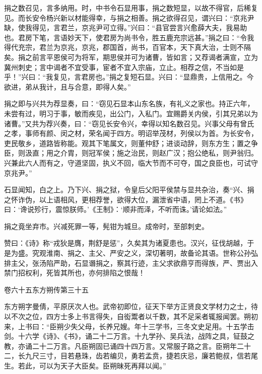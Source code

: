 \documentclass[12pt,UTF8]{ctexbook}
\begin{document}
捐之数召见，言多纳用。时，中书令石显用事，捐之数短显，以故不得官，后稀复见。而长安令杨兴新以材能得幸，与捐之相善。捐之欲得召见，谓兴曰：“京兆尹缺，使我得见，言君兰，京兆尹可立得。”兴曰：“县官尝言兴愈薛大夫，我易助也。君房下笔，言语妙天下，使君房为尚书令，胜五鹿充宗远甚。”捐之曰：“令我得代充宗，君兰为京兆，京兆，郡国首，尚书，百官本，天下真大治，士则不隔矣。捐之前言平恩侯可为将军，期思侯并可为诸曹，皆如言；又荐谒者满宣，立为冀州刺史；言中谒者不宜受事，宦者不宜入宗庙，立止。相荐之信，不当如是乎！”兴曰：“我复见，言君房也。”捐之复短石显。兴曰：“显鼎贵，上信用之。今欲进，弟从我计，且与合意，即得人矣。”



捐之即与兴共为荐显奏，曰：“窃见石显本山东名族，有礼义之家也。持正六年，未尝有过，明习于事，敏而疾见，出公门，入私门。宜赐爵关内侯，引其兄弟以为诸曹。”又共为荐兴奏，曰：“窃见长安令兴，幸得以知名数召见。兴事父母有曾氏之孝，事师有颜、闵之材，荣名闻于四方。明诏举茂材，列侯以为首。为长安令，吏民敬乡，道路皆称能。观其下笔属文，则董仲舒；进谈动辞，则东方生；置之争臣，则汲直；用之介胄，则冠军侯；施之治民，则赵广汉；抱公绝私，则尹翁归。兴兼此六人而有之，守道坚固，执义不回，临大节而不可夺，国之良臣也，可试守京兆尹。”



石显闻知，白之上。乃下兴、捐之狱，令皇后父阳平侯禁与显共杂治，奏“兴、捐之怀诈伪，以上语相风，更相荐誉，欲得大位，漏泄省中语，罔上不道。《书》曰：‘谗说殄行，震惊朕师。’《王制》：‘顺非而泽，不听而诛。’请论如法。”



捐之竟坐弃市。兴减死罪一等，髡钳为城旦。成帝时，至部刺史。



赞曰：《诗》称“戎狄是膺，荆舒是惩”，久矣其为诸夏患也。汉兴，征伐胡越，于是为盛。究观淮南、捐之、主父、严安之义，深切著明，故备论其语。世称公孙弘排主父，张汤陷严助，石显谮捐之，察其行迹，主父求欲鼎亨而得族，严、贾出入禁门招权利，死皆其所也，亦何排陷之恨哉！





卷六十五东方朔传第三十五



东方朔字曼倩，平原厌次人也。武帝初即位，征天下举方正贤良文学材力之士，待以不次之位，四方士多上书言得失，自衒鬻者以千数，其不足采者辄报闻罢。朔初来，上书曰：“臣朔少失父母，长养兄嫂。年十三学书，三冬文史足用。十五学击剑。十六学《诗》、《书》，诵二十二万言。十九学孙、吴兵法，战阵之具，钲鼓之教，亦诵二十二万言。凡臣朔固已诵四十四万言。又常服子路之言。臣朔年二十二，长九尺三寸，目若悬珠，齿若编贝，勇若孟贲，捷若庆忌，廉若鲍叔，信若尾生。若此，可以为天子大臣矣。臣朔昧死再拜以闻。”
\end{document}

